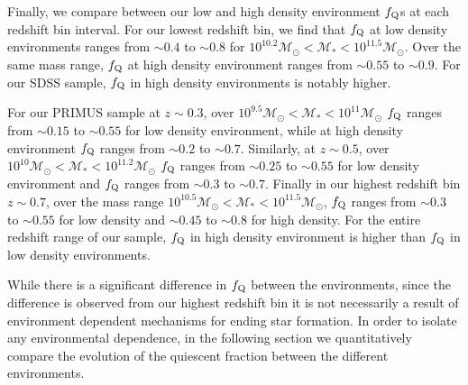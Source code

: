 \documentclass{emulateapj}
\begin{document}

Finally, we compare between our low and high density environment
$f_{\rm{Q}}$s at each redshift bin interval. For our lowest redshift
bin, we find that $f_{\rm{Q}}$ at low density environments ranges from
$\sim 0.4$ to $\sim 0.8$ for $10^{10.2} \mathcal{M}_{\odot} <
\mathcal{M}_{*} < 10^{11.5} \mathcal{M}_{\odot}$. Over the same mass
range, $f_{\rm{Q}}$ at high density environment ranges from $\sim
0.55$ to $\sim 0.9$. For our SDSS sample, $f_{\rm{Q}}$ in
high density environments is notably higher. 

For our PRIMUS sample at $z \sim 0.3$, over $10^{9.5} \mathcal{M}_{\odot} < \mathcal{M}_{*} < 10^{11} \mathcal{M}_{\odot}$ $f_{\rm{Q}}$ ranges from $\sim 0.15$ to $\sim 0.55$ for low density environment, while at high density environment $f_{\rm{Q}}$ ranges from $\sim 0.2$ to $\sim 0.7$. Similarly, at $z \sim 0.5$, over $10^{10} \mathcal{M}_{\odot} < \mathcal{M}_{*} < 10^{11.2} \mathcal{M}_{\odot}$ $f_{\rm{Q}}$ ranges from $\sim 0.25$ to $\sim 0.55$ for low density environment and $f_{\rm{Q}}$ ranges from $\sim 0.3$ to $\sim 0.7$. Finally in our highest redshift bin $z \sim 0.7$, over the mass range $10^{10.5} \mathcal{M}_{\odot} < \mathcal{M}_{*} < 10^{11.5} \mathcal{M}_{\odot}$, $f_{\rm{Q}}$ ranges from $\sim 0.3$ to $\sim 0.55$ for low density and $\sim 0.45$ to $\sim 0.8$ for high density. For the entire redshift range of our sample, $f_{\rm{Q}}$ in high density environment is higher than $f_{\rm{Q}}$ in low density environments. 

While there is a significant difference in $f_{\rm{Q}}$ between the
environments, since the difference is observed from our highest
redshift bin it is not necessarily a result of environment dependent
mechanisms for ending star formation. In order to isolate any
environmental dependence, in the following section we quantitatively
compare the evolution of the quiescent fraction between the different
environments.
\end{document}
